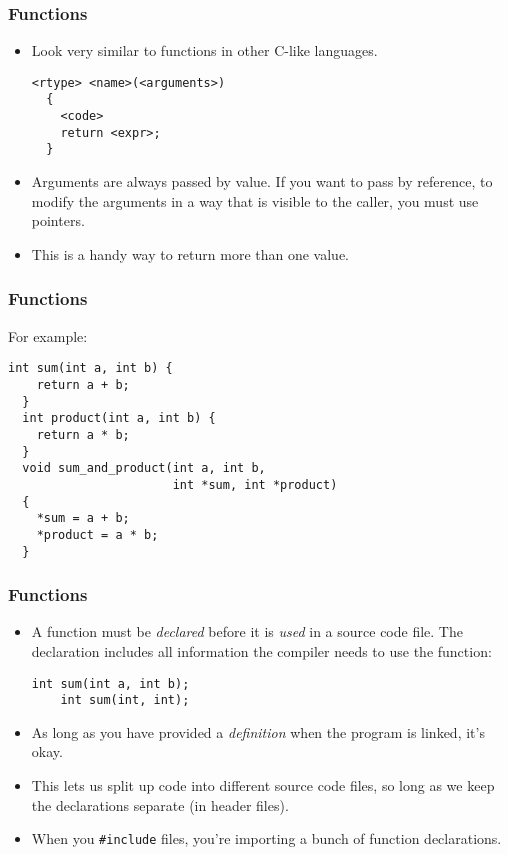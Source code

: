\begin{frame}[fragile]
  \frametitle{Functions}
  \begin{itemize}
  \item Look very similar to functions in other C-like languages.
    \begin{lstlisting}[style=c]
  <rtype> <name>(<arguments>)
  {
    <code>
    return <expr>;
  }
    \end{lstlisting}
  \item Arguments are always passed by value. If you want to pass by reference,
    to modify the arguments in a way that is visible to the caller, you must use
    pointers.
  \item This is a handy way to return more than one value.
  \end{itemize}
\end{frame}

\begin{frame}[fragile]
  \frametitle{Functions}
  For example:
  \begin{lstlisting}[style=c]
  int sum(int a, int b) {
    return a + b;
  }
  int product(int a, int b) {
    return a * b;
  }
  void sum_and_product(int a, int b,
                       int *sum, int *product)
  {
    *sum = a + b;
    *product = a * b;
  }
  \end{lstlisting}
\end{frame}

\begin{frame}[fragile]
  \frametitle{Functions}
  \begin{itemize}
  \item A function must be \emph{declared} before it is \emph{used} in a source
    code file. The declaration includes all information the compiler needs to
    use the function:
    \begin{lstlisting}[style=c]
    int sum(int a, int b);
    int sum(int, int);
    \end{lstlisting}
  \item As long as you have provided a \emph{definition} when the program is
    linked, it's okay.
  \item This lets us split up code into different source code files, so long as
    we keep the declarations separate (in header files).
  \item When you \texttt{\#include} files, you're importing a bunch of function
    declarations.
  \end{itemize}
\end{frame}

